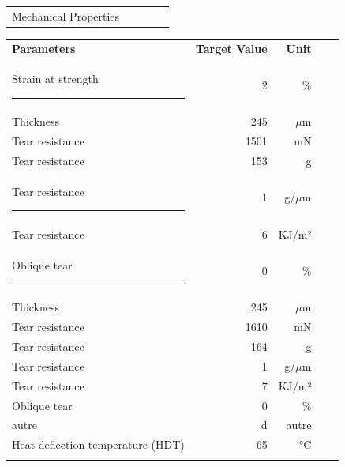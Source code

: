 \documentclass{article}
\begin{document}
\begin{center}
\begin{tabularx}
{\textwidth}{X r  r  r  r }\rowcolor{color_title}Mechanical Properties &  &  &  &  \\

\end{tabularx}\begin{paracol}{2}
\begin{tabularx}{0.5\textwidth}
{X r  r  r  r }\textbf{Parameters} & \textbf{Target Value} & \textbf{Unit} &  &  \\
Strain at strength \rule{80pt}{0pt} & 2 & \% &  &  \\
\arrayrulecolor{line_color}\hline
Thickness & 245 & \(\mu\)m &  &  \\
\arrayrulecolor{line_color}\hline
Tear resistance & 1501 & mN &  &  \\
\arrayrulecolor{line_color}\hline
Tear resistance & 153 & g &  &  \\
\arrayrulecolor{line_color}\hline
Tear resistance \rule{80pt}{0pt} & 1 & g/\(\mu\)m &  &  \\
\arrayrulecolor{line_color}\hline
Tear resistance & 6 & KJ/m² &  &  \\
\arrayrulecolor{line_color}\hline
Oblique tear \rule{80pt}{0pt} & 0 & \% &  &  \\
\arrayrulecolor{line_color}\hline
Thickness & 245 & \(\mu\)m &  &  \\
\arrayrulecolor{line_color}\hline
Tear resistance & 1610 & mN &  &  \\
\arrayrulecolor{line_color}\hline
Tear resistance & 164 & g &  &  \\
\arrayrulecolor{line_color}\hline
Tear resistance & 1 & g/\(\mu\)m &  &  \\
\arrayrulecolor{line_color}\hline
Tear resistance & 7 & KJ/m² &  &  \\
\arrayrulecolor{line_color}\hline
Oblique tear & 0 & \% &  &  \\
\arrayrulecolor{line_color}\hline
autre & d & autre &  &  \\
\arrayrulecolor{line_color}\hline
Heat deflection temperature (HDT) & 65 & °C &  &  \\
\arrayrulecolor{line_color}\hline


\end{tabularx}
\end{paracol}
\end{center}
\end{document}
